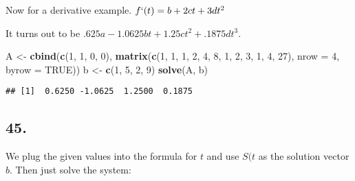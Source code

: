 \documentclass[]{article}
\newenvironment{Shaded}{\begin{snugshade}}{\end{snugshade}}
\newcommand{\DataTypeTok}[1]{\textcolor[rgb]{0.13,0.29,0.53}{#1}}
\newcommand{\DecValTok}[1]{\textcolor[rgb]{0.00,0.00,0.81}{#1}}
\newcommand{\KeywordTok}[1]{\textcolor[rgb]{0.13,0.29,0.53}{\textbf{#1}}}
\newcommand{\NormalTok}[1]{#1}
\newcommand{\OtherTok}[1]{\textcolor[rgb]{0.56,0.35,0.01}{#1}}
\newcommand{\StringTok}[1]{\textcolor[rgb]{0.31,0.60,0.02}{#1}}
\begin{document}
Now for a derivative example. \(f`(t) = b + 2ct +3dt^2\)

It turns out to be \(.625a - 1.0625bt + 1.25ct^2 + .1875dt^3\).

\begin{Shaded}
\begin{Highlighting}[]
\NormalTok{A <-}\StringTok{ }\KeywordTok{cbind}\NormalTok{(}\KeywordTok{c}\NormalTok{(}\DecValTok{1}\NormalTok{, }\DecValTok{1}\NormalTok{, }\DecValTok{0}\NormalTok{, }\DecValTok{0}\NormalTok{), }
           \KeywordTok{matrix}\NormalTok{(}\KeywordTok{c}\NormalTok{(}\DecValTok{1}\NormalTok{, }\DecValTok{1}\NormalTok{, }\DecValTok{1}\NormalTok{, }\DecValTok{2}\NormalTok{, }\DecValTok{4}\NormalTok{, }\DecValTok{8}\NormalTok{, }\DecValTok{1}\NormalTok{, }\DecValTok{2}\NormalTok{, }\DecValTok{3}\NormalTok{, }\DecValTok{1}\NormalTok{, }\DecValTok{4}\NormalTok{, }\DecValTok{27}\NormalTok{), }\DataTypeTok{nrow =} \DecValTok{4}\NormalTok{, }\DataTypeTok{byrow =} \OtherTok{TRUE}\NormalTok{))}
\NormalTok{b <-}\StringTok{ }\KeywordTok{c}\NormalTok{(}\DecValTok{1}\NormalTok{, }\DecValTok{5}\NormalTok{, }\DecValTok{2}\NormalTok{, }\DecValTok{9}\NormalTok{)}
\KeywordTok{solve}\NormalTok{(A, b)}
\end{Highlighting}
\end{Shaded}

\begin{verbatim}
## [1]  0.6250 -1.0625  1.2500  0.1875
\end{verbatim}

\hypertarget{section-11}{%
\subsection{45.}\label{section-11}}

We plug the given values into the formula for \(t\) and use \(S(t\) as
the solution vector \(b\). Then just solve the system:
\end{document}
